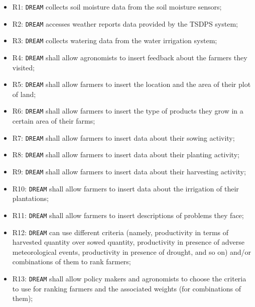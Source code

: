 \documentclass{article}
\begin{document}
\begin{itemize}
    \item R1: \verb|DREAM| collects soil moisture data from the soil moisture sensors;
    \item R2: \verb|DREAM| accesses weather reports data provided by the TSDPS system;

    \item R3: \verb|DREAM| collects watering data from the water irrigation system;

    \item R4: \verb|DREAM| shall allow agronomists to insert feedback about the farmers they visited;

    \item R5: \verb|DREAM| shall allow farmers to insert the location and the area of their plot of land;

    \item R6: \verb|DREAM| shall allow farmers to insert the type of products they grow in a certain area of their farms;

    \item R7: \verb|DREAM| shall allow farmers to insert data about their sowing activity;

    \item R8: \verb|DREAM| shall allow farmers to insert data about their planting activity;
    
    \item R9: \verb|DREAM| shall allow farmers to insert data about their harvesting activity;
    
    \item R10: \verb|DREAM| shall allow farmers to insert data about the irrigation of their plantations;
    
    \item R11: \verb|DREAM| shall allow farmers to insert descriptions of problems they face;
    
    \item R12: \verb|DREAM| can use different criteria (namely, productivity in terms of harvested quantity over sowed quantity, productivity in presence of adverse meteorological events, productivity in presence of drought, and so on) and/or combinations of them to rank farmers;
    
    \item R13: \verb|DREAM| shall allow policy makers and agronomists to choose the criteria to use for ranking farmers and the associated weights (for combinations of them);
    

\end{itemize}
\end{document}
